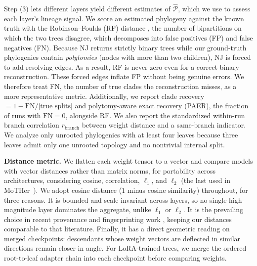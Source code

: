 \documentclass{article}
\theoremstyle{definition}
\theoremstyle{plain}
\begin{document}
Step (3) lets different layers yield different estimates of $\widehat{\mathcal{P}}$, which we use to
assess each layer's lineage signal. We score an estimated phylogeny against the known truth with the
Robinson--Foulds (RF) distance \citep{robinson1981comparison}, the number of bipartitions on which the
two trees disagree, which decomposes into false positives (FP) and false negatives (FN). Because NJ
returns strictly binary trees while our ground-truth phylogenies contain \textit{polytomies} (nodes with
more than two children), NJ is forced to add resolving edges. As a result, RF is never zero even for a correct binary
reconstruction. These forced edges inflate FP without being genuine errors. We therefore treat FN, the
number of true clades the reconstruction misses, as a more representative metric. Additionally, we report clade
recovery $= 1 - \mathrm{FN}/|\text{true splits}|$ and polytomy-aware exact recovery (PAER), the fraction of
runs with $\mathrm{FN}=0$, alongside RF. We also report the standardized within-run branch correlation
$r_{\mathrm{branch}}$ between weight distance and a same-branch indicator. We analyze only unrooted
phylogenies with at least four leaves because three leaves admit only one unrooted topology and no
nontrivial internal split.


\textbf{Distance metric.}\label{sec:framework:metric}
We flatten each weight tensor to a vector and compare models with vector distances rather than matrix
norms, for portability across architectures, considering cosine, correlation, $\ell_1$, and $\ell_2$
(the last used in MoTHer~\citep{horwitz2025mother}). We adopt cosine distance ($1$ minus cosine
similarity) throughout, for three reasons. It is bounded and scale-invariant across layers, so no single
high-magnitude layer dominates the aggregate, unlike $\ell_1$ or $\ell_2$. It is the prevailing choice in
recent provenance and fingerprinting work \citep{zeng2024huref, behavioral2026provenance,
zhu2025independence}, keeping our distances comparable to that literature. Finally, it has a direct geometric
reading on merged checkpoints: descendants whose weight vectors are deflected in similar directions remain closer in angle. For LoRA-trained trees, we merge the ordered root-to-leaf adapter chain into each checkpoint before comparing weights.
\end{document}

